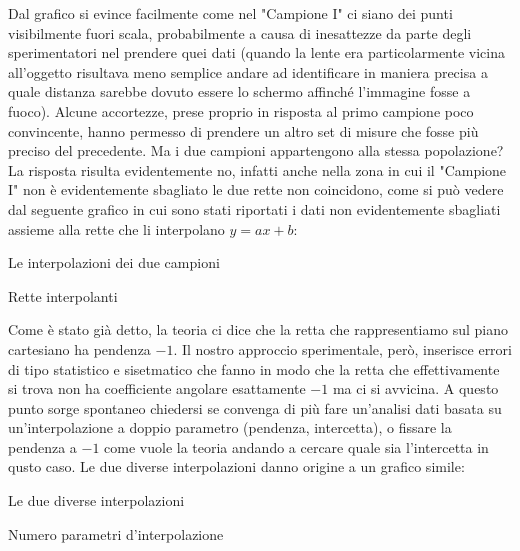 Dal grafico si evince facilmente come nel "Campione I" ci siano dei punti visibilmente fuori scala, probabilmente a causa di
 inesattezze da parte degli sperimentatori nel prendere quei dati (quando la lente era particolarmente vicina all'oggetto risultava
 meno semplice andare ad identificare in maniera precisa a quale distanza sarebbe dovuto essere lo schermo affinché l'immagine
 fosse a fuoco). Alcune accortezze, prese proprio in risposta al primo campione poco convincente, hanno permesso di prendere
 un altro set di misure che fosse più preciso del precedente. Ma i due campioni appartengono alla stessa popolazione? La risposta
 risulta evidentemente no, infatti anche nella zona in cui il "Campione I" non è evidentemente sbagliato le due rette non coincidono,
 come si può vedere dal seguente grafico in cui sono stati riportati i dati non evidentemente sbagliati assieme alla rette che li
 interpolano $y = ax + b$:
\begin{grafico} \centering  \caption{Le interpolazioni dei due campioni} \label{gr:02graph2.tex} \end{grafico}
\begin{tabella}
	\centering
	
	\caption{Rette interpolanti}
	\label{tab:02tab3}
\end{tabella}

Come è stato già detto, la teoria ci dice che la retta che rappresentiamo sul piano cartesiano ha pendenza $-1$. Il nostro approccio
 sperimentale, però, inserisce errori di tipo statistico e sisetmatico che fanno in modo che la retta che effettivamente si trova
 non ha coefficiente angolare esattamente $-1$ ma ci si avvicina. A questo punto sorge spontaneo chiedersi se convenga di più fare
 un'analisi dati basata su un'interpolazione a doppio parametro (pendenza, intercetta), o fissare la pendenza a $-1$ come vuole la
 teoria andando a cercare quale sia l'intercetta in qusto caso. Le due diverse interpolazioni danno origine a un grafico simile:
\begin{grafico} \centering  \caption{Le due diverse interpolazioni} \label{gr:02_graph_3.tex} \end{grafico}
\begin{tabella}
	\centering
	
	\caption{Numero parametri d'interpolazione}
	\label{tab:02tab4}
\end{tabella}

